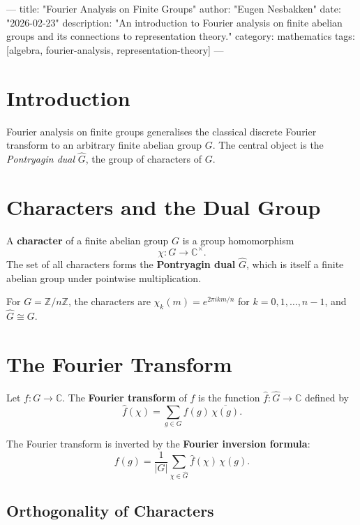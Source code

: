 ---
title: "Fourier Analysis on Finite Groups"
author: "Eugen Nesbakken"
date: "2026-02-23"
description: "An introduction to Fourier analysis on finite abelian groups and its connections to representation theory."
category: mathematics
tags: [algebra, fourier-analysis, representation-theory]
---

\section{Introduction}

Fourier analysis on finite groups generalises the classical discrete Fourier transform to an arbitrary finite abelian group $G$.
The central object is the \emph{Pontryagin dual} $\hat{G}$, the group of characters of $G$.

\section{Characters and the Dual Group}

\begin{definition}[Character]
A \textbf{character} of a finite abelian group $G$ is a group homomorphism
\[
  \chi : G \to \mathbb{C}^{\times}.
\]
The set of all characters forms the \textbf{Pontryagin dual} $\hat{G}$, which is itself a finite abelian group under pointwise multiplication.
\end{definition}

For $G = \mathbb{Z}/n\mathbb{Z}$, the characters are $\chi_k(m) = e^{2\pi i km/n}$ for $k = 0, 1, \ldots, n-1$, and $\hat{G} \cong G$.

\section{The Fourier Transform}

\begin{definition}
Let $f : G \to \mathbb{C}$.
The \textbf{Fourier transform} of $f$ is the function $\hat{f} : \hat{G} \to \mathbb{C}$ defined by
\[
  \hat{f}(\chi) = \sum_{g \in G} f(g)\,\overline{\chi(g)}.
\]
\end{definition}

The Fourier transform is inverted by the \textbf{Fourier inversion formula}:
\[
  f(g) = \frac{1}{|G|} \sum_{\chi \in \hat{G}} \hat{f}(\chi)\,\chi(g).
\]

\subsection{Orthogonality of Characters}

